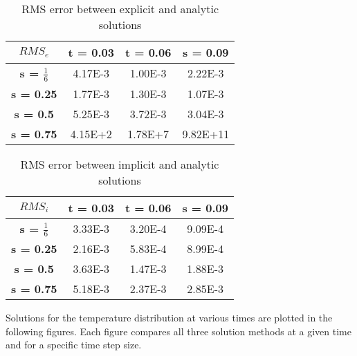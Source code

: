 \documentclass[twocolumn,10pt]{asme2ej}
\begin{document}

\begin{table}[h]
\begin{center}
\label{table_ASME}
\begin{tabular}{|c | c c c|}
\hline
$RMS_e$  & \textbf{t = 0.03} & \textbf{t = 0.06} & \textbf{s = 0.09}\\
\hline
\textbf{s = $\frac{1}{6}$} & 4.17E-3 & 1.00E-3 & 2.22E-3\\
\textbf{s = 0.25}         	  & 1.77E-3 & 1.30E-3 & 1.07E-3\\
\textbf{s = 0.5} 		  & 5.25E-3 & 3.72E-3 & 3.04E-3\\
\textbf{s = 0.75} 		  & 4.15E+2 & 1.78E+7 & 9.82E+11\\
\hline
\end{tabular}
\caption{RMS error between explicit and analytic solutions}
\end{center}
\end{table}

\vspace{-4em}

\begin{table}[h]
\begin{center}
\label{table_ASME}
\begin{tabular}{|c | c c c|}
\hline
$RMS_i$  & \textbf{t = 0.03} & \textbf{t = 0.06} & \textbf{s = 0.09}\\
\hline
\textbf{s = $\frac{1}{6}$} & 3.33E-3 & 3.20E-4 & 9.09E-4\\
\textbf{s = 0.25}         	  & 2.16E-3 & 5.83E-4 & 8.99E-4\\
\textbf{s = 0.5} 		  & 3.63E-3 & 1.47E-3 & 1.88E-3\\
\textbf{s = 0.75} 		  & 5.18E-3 & 2.37E-3 & 2.85E-3\\
\hline
\end{tabular}
\caption{RMS error between implicit and analytic solutions}
\end{center}
\end{table}

\vspace{-1em}

Solutions for the temperature distribution at various times are plotted in the following figures.  Each figure compares all three solution methods at a given time and for a specific time step size.
\end{document}
